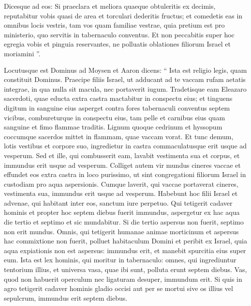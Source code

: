 \begin{biblechapter}
\begin{biblechapter}
\begin{biblechapter}
\begin{biblechapter}
\begin{biblechapter}
\begin{biblechapter}
\begin{biblechapter}
\begin{biblechapter}
\begin{biblechapter}
\begin{biblechapter}
\begin{biblechapter}
\begin{biblechapter}
\begin{biblechapter}
\begin{biblechapter}
\begin{biblechapter}
\begin{biblechapter}
\begin{biblechapter}
\begin{biblechapter}
 \verse Dicesque ad eos: Si praeclara et meliora quaeque obtuleritis ex decimis, reputabitur vobis quasi de area et torculari dederitis fructus; 
\verse et comedetis eas in omnibus locis vestris, tam vos quam familiae vestrae, quia pretium est pro ministerio, quo servitis in tabernaculo conventus. 
\verse Et non peccabitis super hoc egregia vobis et pinguia reservantes, ne polluatis oblationes filiorum Israel et moriamini ”.
 
\begin{biblechapter}
\verse Locutusque est Dominus ad Moysen et Aaron dicens: 
\verse “ Ista est religio legis, quam constituit Dominus. Praecipe filiis Israel, ut adducant ad te vaccam rufam aetatis integrae, in qua nulla sit macula, nec portaverit iugum. 
 \verse Tradetisque eam Eleazaro sacerdoti, quae educta extra castra mactabitur in conspectu eius; 
\verse et tinguens digitum in sanguine eius asperget contra fores tabernaculi conventus septem vicibus, 
\verse combureturque in conspectu eius, tam pelle et carnibus eius quam sanguine et fimo flammae traditis. 
\verse Lignum quoque cedrinum et hyssopum coccumque sacerdos mittet in flammam, quae vaccam vorat. 
\verse Et tunc demum, lotis vestibus et corpore suo, ingredietur in castra commaculatusque erit usque ad vesperum. 
\verse Sed et ille, qui combusserit eam, lavabit vestimenta sua et corpus, et immundus erit usque ad vesperum. 
\verse Colliget autem vir mundus cineres vaccae et effundet eos extra castra in loco purissimo, ut sint congregationi filiorum Israel in custodiam pro aqua aspersionis.
 \verse Cumque laverit, qui vaccae portaverat cineres, vestimenta sua, immundus erit usque ad vesperum. Habebunt hoc filii Israel et advenae, qui habitant inter eos, sanctum iure perpetuo.
 \verse Qui tetigerit cadaver hominis et propter hoc septem diebus fuerit immundus, 
\verse aspergetur ex hac aqua die tertio et septimo et sic mundabitur. Si die tertio aspersus non fuerit, septimo non erit mundus. 
\verse Omnis, qui tetigerit humanae animae morticinum et aspersus hac commixtione non fuerit, polluet habitaculum Domini et peribit ex Israel, quia aqua expiationis non est aspersus: immundus erit, et manebit spurcitia eius super eum.
 \verse Ista est lex hominis, qui moritur in tabernaculo: omnes, qui ingrediuntur tentorium illius, et universa vasa, quae ibi sunt, polluta erunt septem diebus. 
\verse Vas, quod non habuerit operculum nec ligaturam desuper, immundum erit. 
 \verse Si quis in agro tetigerit cadaver hominis gladio occisi aut per se mortui sive os illius vel sepulcrum, immundus erit septem diebus. 

\end{biblechapter}
\end{biblechapter}
\end{biblechapter}
\end{biblechapter}
\end{biblechapter}
\end{biblechapter}
\end{biblechapter}
\end{biblechapter}
\end{biblechapter}
\end{biblechapter}
\end{biblechapter}
\end{biblechapter}
\end{biblechapter}
\end{biblechapter}
\end{biblechapter}
\end{biblechapter}
\end{biblechapter}
\end{biblechapter}
\end{biblechapter}

